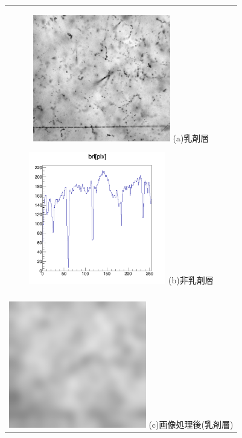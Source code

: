 \documentclass[12pt,a4paper]{jarticle}
\begin{document}
\begin{figure}[htbp]
  \centering
      \begin{tabular}{c}
        \begin{minipage}{0.5\hsize}
          \centering
            \includegraphics[clip, width=60mm]{cont.png}
            \hspace{1.6cm} (a)乳剤層
        \end{minipage}
        
        \begin{minipage}{0.5\hsize}
          \centering
            \includegraphics[clip, width=60mm]{cont_hist2.png}
            \hspace{1.6cm} (b)非乳剤層
        \end{minipage}
        \\
        \\
        \begin{minipage}{0.5\hsize}
          \centering
              \includegraphics[clip, width=60mm]{gau2.png}
              \hspace{1.6cm} (c)画像処理後(乳剤層)
          \end{minipage}
          

\end{tabular}
\end{figure}
\end{document}
